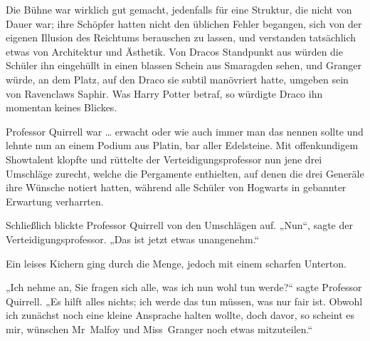 \later

Die Bühne war wirklich gut gemacht, jedenfalls für eine Struktur, die nicht von Dauer war; ihre Schöpfer hatten nicht den üblichen Fehler begangen, sich von der eigenen Illusion des Reichtums berauschen zu lassen, und verstanden tatsächlich etwas von Architektur und Ästhetik. Von Dracos Standpunkt aus würden die Schüler ihn eingehüllt in einen blassen Schein aus Smaragden sehen, und Granger würde, an dem Platz, auf den Draco sie subtil manövriert hatte, umgeben sein von Ravenclaws Saphir. Was Harry Potter betraf, so würdigte Draco ihn momentan keines Blickes.

Professor Quirrell war … erwacht oder wie auch immer man das nennen sollte und lehnte nun an einem Podium aus Platin, bar aller Edelsteine. Mit offenkundigem Showtalent klopfte und rüttelte der Verteidigungsprofessor nun jene drei Umschläge zurecht, welche die Pergamente enthielten, auf denen die drei Generäle ihre Wünsche notiert hatten, während alle Schüler von Hogwarts in gebannter Erwartung verharrten.

Schließlich blickte Professor Quirrell von den Umschlägen auf.
„Nun“, sagte der Verteidigungsprofessor.
„Das ist jetzt etwas unangenehm.“

Ein leises Kichern ging durch die Menge, jedoch mit einem scharfen Unterton.

„Ich nehme an, Sie fragen sich alle, was ich nun wohl tun werde?“ sagte Professor Quirrell.
„Es hilft alles nichts; ich werde das tun müssen, was nur fair ist. Obwohl ich zunächst noch eine kleine Ansprache halten wollte, doch davor, so scheint es mir, wünschen Mr~Malfoy und Miss~Granger noch etwas mitzuteilen.“

